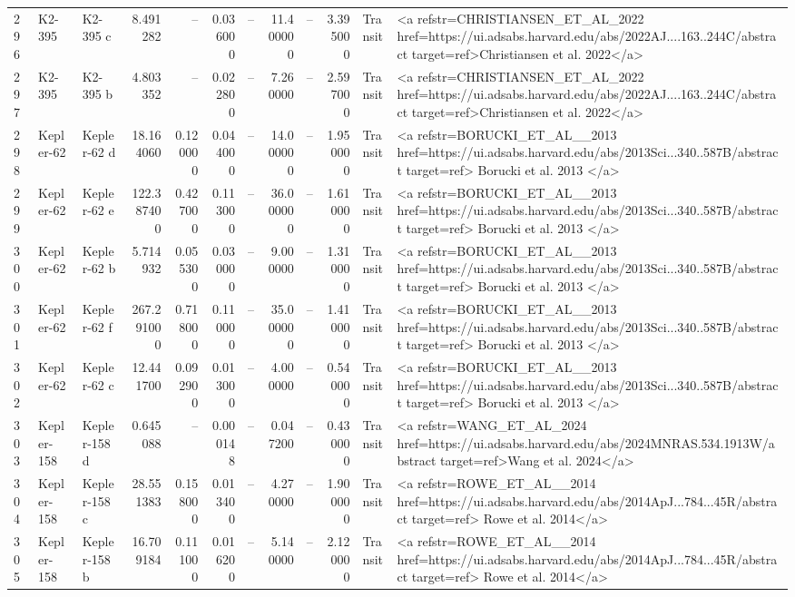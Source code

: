 \begin{tabular}{lllrrrrrrrll}
296 & K2-395 & K2-395 c & 8.491282 & -- & 0.036000 & -- & 11.400000 & -- & 3.395000 & Transit & <a refstr=CHRISTIANSEN_ET_AL_2022 href=https://ui.adsabs.harvard.edu/abs/2022AJ....163..244C/abstract target=ref>Christiansen et al. 2022</a> \\
297 & K2-395 & K2-395 b & 4.803352 & -- & 0.022800 & -- & 7.260000 & -- & 2.597000 & Transit & <a refstr=CHRISTIANSEN_ET_AL_2022 href=https://ui.adsabs.harvard.edu/abs/2022AJ....163..244C/abstract target=ref>Christiansen et al. 2022</a> \\
298 & Kepler-62 & Kepler-62 d & 18.164060 & 0.120000 & 0.044000 & -- & 14.000000 & -- & 1.950000 & Transit & <a refstr=BORUCKI_ET_AL__2013 href=https://ui.adsabs.harvard.edu/abs/2013Sci...340..587B/abstract target=ref> Borucki et al. 2013 </a> \\
299 & Kepler-62 & Kepler-62 e & 122.387400 & 0.427000 & 0.113000 & -- & 36.000000 & -- & 1.610000 & Transit & <a refstr=BORUCKI_ET_AL__2013 href=https://ui.adsabs.harvard.edu/abs/2013Sci...340..587B/abstract target=ref> Borucki et al. 2013 </a> \\
300 & Kepler-62 & Kepler-62 b & 5.714932 & 0.055300 & 0.030000 & -- & 9.000000 & -- & 1.310000 & Transit & <a refstr=BORUCKI_ET_AL__2013 href=https://ui.adsabs.harvard.edu/abs/2013Sci...340..587B/abstract target=ref> Borucki et al. 2013 </a> \\
301 & Kepler-62 & Kepler-62 f & 267.291000 & 0.718000 & 0.110000 & -- & 35.000000 & -- & 1.410000 & Transit & <a refstr=BORUCKI_ET_AL__2013 href=https://ui.adsabs.harvard.edu/abs/2013Sci...340..587B/abstract target=ref> Borucki et al. 2013 </a> \\
302 & Kepler-62 & Kepler-62 c & 12.441700 & 0.092900 & 0.013000 & -- & 4.000000 & -- & 0.540000 & Transit & <a refstr=BORUCKI_ET_AL__2013 href=https://ui.adsabs.harvard.edu/abs/2013Sci...340..587B/abstract target=ref> Borucki et al. 2013 </a> \\
303 & Kepler-158 & Kepler-158 d & 0.645088 & -- & 0.000148 & -- & 0.047200 & -- & 0.430000 & Transit & <a refstr=WANG_ET_AL_2024 href=https://ui.adsabs.harvard.edu/abs/2024MNRAS.534.1913W/abstract target=ref>Wang et al. 2024</a> \\
304 & Kepler-158 & Kepler-158 c & 28.551383 & 0.158000 & 0.013400 & -- & 4.270000 & -- & 1.900000 & Transit & <a refstr=ROWE_ET_AL__2014 href=https://ui.adsabs.harvard.edu/abs/2014ApJ...784...45R/abstract target=ref> Rowe et al. 2014</a> \\
305 & Kepler-158 & Kepler-158 b & 16.709184 & 0.111000 & 0.016200 & -- & 5.140000 & -- & 2.120000 & Transit & <a refstr=ROWE_ET_AL__2014 href=https://ui.adsabs.harvard.edu/abs/2014ApJ...784...45R/abstract target=ref> Rowe et al. 2014</a> \\

\end{tabular}

